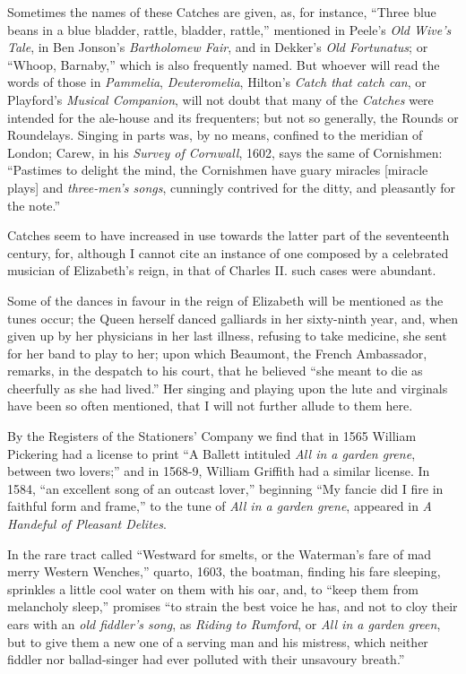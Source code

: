 Sometimes the names of these Catches are given, as, for instance, “Three blue
beans in a blue bladder, rattle, bladder, rattle,” mentioned in Peele’s \textit{Old Wive’s
Tale}, in Ben Jonson’s \textit{Bartholomew Fair}, and in Dekker’s \textit{Old Fortunatus}; or
“Whoop, Barnaby,” which is also frequently named. But whoever will read the
words of those in \textit{Pammelia}, \textit{Deuteromelia}, Hilton’s \textit{Catch that catch can}, or Playford’s
\textit{Musical Companion}, will not doubt that many of the \textit{Catches} were intended for
the ale-house and its frequenters; but not so generally, the Rounds or Roundelays. 
Singing in parts was, by no means, confined to the meridian of London;
Carew, in his \textit{Survey of Cornwall}, 1602, says the same of Cornishmen: “Pastimes
to delight the mind, the Cornishmen have guary miracles [miracle plays] and
\textit{three-men’s songs}, cunningly contrived for the ditty, and pleasantly for the note.”

Catches seem to have increased in use towards the latter part of the seventeenth
century, for, although I cannot cite an instance of one composed by a
celebrated musician of Elizabeth’s reign, in that of Charles II. such cases were
abundant.

Some of the dances in favour in the reign of Elizabeth will be mentioned as
the tunes occur; the Queen herself danced galliards in her sixty-ninth year, and,
when given up by her physicians in her last illness, refusing to take medicine, she
sent for her band to play to her; upon which Beaumont, the French Ambassador,
remarks, in the despatch to his court, that he believed “she meant to die as
cheerfully as she had lived.” Her singing and playing upon the lute and
virginals have been so often mentioned, that I will not further allude to them
here.

\centerrule


By the Registers of the Stationers’ Company we find that in 1565 William
Pickering had a license to print “A Ballett intituled \textit{All in a garden grene},
between two lovers;” and in 1568-9, William Griffith had a similar license. In
1584, “an excellent song of an outcast lover,” beginning “My fancie did I fire
in faithful form and frame,” to the tune of \textit{All in a garden grene}, appeared in
\textit{A Handeful of Pleasant Delites}.

In the rare tract called “Westward for smelts, or the Waterman’s fare of mad
merry Western Wenches,” quarto, 1603, the boatman, finding his fare sleeping,
sprinkles a little cool water on them with his oar, and, to “keep them from melancholy 
sleep,” promises “to strain the best voice \pagebreak he has, and not to cloy their ears
with an \textit{old fiddler’s song}, as \textit{Riding to Rumford}, or \textit{All in a garden green}, but to
give them a new one of a serving man and his mistress, which neither fiddler nor
ballad-singer had ever polluted with their unsavoury breath.”

